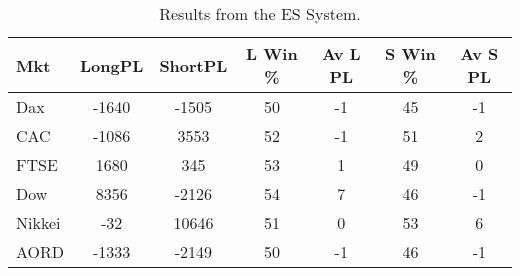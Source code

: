\begin{table}[ht]
\centering
\caption[Results from the ES System]{Results from the ES System.} 
\label{tab:es_sys}
\begin{tabular}{lcccccc}
  \toprule Mkt & LongPL & ShortPL & L Win \% & Av L PL & S Win \% & Av S PL \\ 
  \midrule Dax & -1640 & -1505 & 50 & -1 & 45 & -1 \\ 
  CAC & -1086 & 3553 & 52 & -1 & 51 & 2 \\ 
  FTSE & 1680 & 345 & 53 & 1 & 49 & 0 \\ 
  Dow & 8356 & -2126 & 54 & 7 & 46 & -1 \\ 
  Nikkei & -32 & 10646 & 51 & 0 & 53 & 6 \\ 
  AORD & -1333 & -2149 & 50 & -1 & 46 & -1 \\ 
   \bottomrule \end{tabular}
\end{table}
